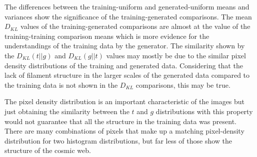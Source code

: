 \documentclass[twocolumn]{article}
\numberwithin{equation}{section}
\begin{document}
The differences between the training-uniform and generated-uniform means and variances show the significance of the 
training-generated comparisons. The mean $D_{KL}$ values of the training-generated comparisons are almost at the value of 
the training-training comparison means which is more evidence for the understandings of the training data by the generator. 
The similarity shown by the $D_{KL}(t||g)$ and $D_{KL}(g||t)$ values may mostly be due to the similar pixel density 
distributions of the training and generated data. Considering that the lack of filament structure in the larger scales 
of the generated data compared to the training data is not shown in the $D_{KL}$ comparisons, this may be true. 

The pixel density distribution is an important characteristic of the images but just obtaining the 
similarity between the $t$ and $g$ distributions with this property would not guarantee that all the structure in the 
training data was present. There are many combinations of pixels that make up a matching pixel-density distribution for 
two histogram distributions, but far less of those show the structure of the cosmic web. 



\end{document}
